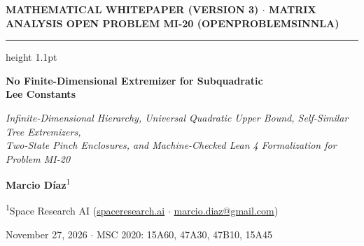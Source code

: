 \documentclass[10pt,letterpaper]{article}
\begin{document}
\thispagestyle{firstpage}

{\sffamily\footnotesize\bfseries\color{accentblue}MATHEMATICAL WHITEPAPER (VERSION 3) $\cdot$ MATRIX ANALYSIS \hfill OPEN PROBLEM MI-20 (OPENPROBLEMSINNLA)}\par
\vspace{2pt}
{\color{ink}\hrule height 1.1pt}
\vspace{11pt}

\begin{center}
  {\LARGE\bfseries\color{ink} No Finite-Dimensional Extremizer for Subquadratic\\[3pt] Lee Constants}\par
  \vspace{6pt}
  {\large\itshape\color{muted} Infinite-Dimensional Hierarchy, Universal Quadratic Upper Bound, Self-Similar Tree Extremizers,\\[1pt] Two-State Pinch Enclosures, and Machine-Checked Lean 4 Formalization for Problem MI-20}\par
  \vspace{8pt}
  {\normalsize\bfseries Marcio Díaz}\textsuperscript{1}\par
  \vspace{1.5pt}
  {\small\color{muted}\textsuperscript{1}Space Research AI (\href{https://spaceresearch.ai}{spaceresearch.ai} $\cdot$ \href{mailto:marcio.diaz@gmail.com}{marcio.diaz@gmail.com})}\par
  {\footnotesize\color{muted}November 27, 2026 \quad $\cdot$ \quad MSC 2020: 15A60, 47A30, 47B10, 15A45}
\end{center}
\vspace{3pt}
\end{document}
